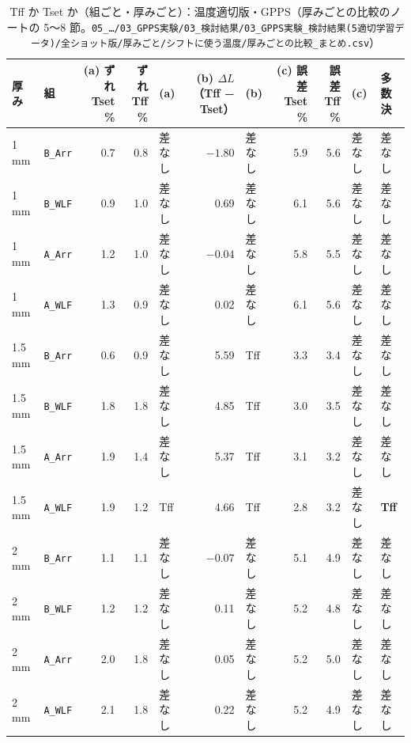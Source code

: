 \documentclass[paper=a4paper,landscape,fontsize=10pt,line_length=62zw,number_of_lines=34]{jlreq}
\let\origtextbf\textbf
\renewcommand{\textbf}[1]{\origtextbf{\gtfamily #1}}   %
\begin{document}
\begin{table}[H]\centering\footnotesize
\caption{Tff か Tset か（組ごと・厚みごと）：温度適切版・GPPS（厚みごとの比較のノートの 5〜8 節。\texttt{05\_\allowbreak{}…/\allowbreak{}03\_\allowbreak{}GPPS実験/\allowbreak{}03\_\allowbreak{}検討結果/\allowbreak{}03\_\allowbreak{}GPPS実験\_\allowbreak{}検討結果(5適切学習データ)/\allowbreak{}全ショット版/\allowbreak{}厚みごと/\allowbreak{}シフトに使う温度/\allowbreak{}厚みごとの比較\_\allowbreak{}まとめ.csv}）}
\begin{tabular}{llrrlrlrrll}
\toprule
厚み & 組 & (a) ずれ Tset \% & ずれ Tff \% & (a) & (b) $\Delta L$（Tff − Tset） & (b) & (c) 誤差 Tset \% & 誤差 Tff \% & (c) & 多数決 \\
\midrule
1 mm & \texttt{B\_\allowbreak{}Arr} & 0.7 & 0.8 & 差なし & $-1.80$ & 差なし & 5.9 & 5.6 & 差なし & 差なし \\
1 mm & \texttt{B\_\allowbreak{}WLF} & 0.9 & 1.0 & 差なし & 0.69 & 差なし & 6.1 & 5.6 & 差なし & 差なし \\
1 mm & \texttt{A\_\allowbreak{}Arr} & 1.2 & 1.0 & 差なし & $-0.04$ & 差なし & 5.8 & 5.5 & 差なし & 差なし \\
1 mm & \texttt{A\_\allowbreak{}WLF} & 1.3 & 0.9 & 差なし & 0.02 & 差なし & 6.1 & 5.6 & 差なし & 差なし \\
1.5 mm & \texttt{B\_\allowbreak{}Arr} & 0.6 & 0.9 & 差なし & 5.59 & Tff & 3.3 & 3.4 & 差なし & 差なし \\
1.5 mm & \texttt{B\_\allowbreak{}WLF} & 1.8 & 1.8 & 差なし & 4.85 & Tff & 3.0 & 3.5 & 差なし & 差なし \\
1.5 mm & \texttt{A\_\allowbreak{}Arr} & 1.9 & 1.4 & 差なし & 5.37 & Tff & 3.1 & 3.2 & 差なし & 差なし \\
1.5 mm & \texttt{A\_\allowbreak{}WLF} & 1.9 & 1.2 & Tff & 4.66 & Tff & 2.8 & 3.2 & 差なし & \textbf{Tff} \\
2 mm & \texttt{B\_\allowbreak{}Arr} & 1.1 & 1.1 & 差なし & $-0.07$ & 差なし & 5.1 & 4.9 & 差なし & 差なし \\
2 mm & \texttt{B\_\allowbreak{}WLF} & 1.2 & 1.2 & 差なし & 0.11 & 差なし & 5.2 & 4.8 & 差なし & 差なし \\
2 mm & \texttt{A\_\allowbreak{}Arr} & 2.0 & 1.8 & 差なし & 0.05 & 差なし & 5.2 & 5.0 & 差なし & 差なし \\
2 mm & \texttt{A\_\allowbreak{}WLF} & 2.1 & 1.8 & 差なし & 0.22 & 差なし & 5.2 & 4.9 & 差なし & 差なし \\
\bottomrule
\end{tabular}
\end{table}
\clearpage
\end{document}
